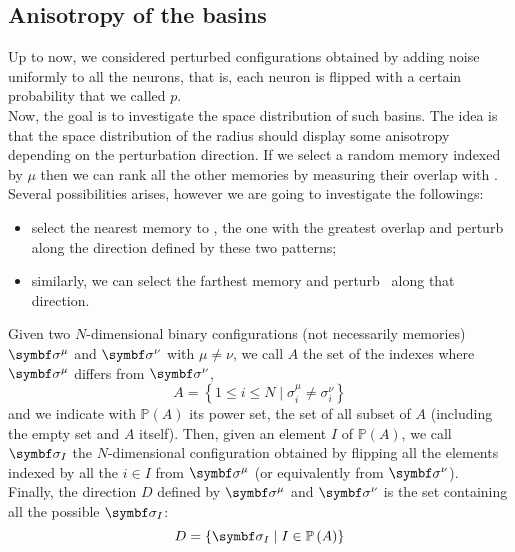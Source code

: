 \documentclass[\rootdir/main.tex]{subfiles}
\begin{document}
\clearpage
\subsection{Anisotropy of the basins}
Up to now, we considered perturbed configurations obtained by adding noise uniformly to all the neurons, that is, each neuron is flipped with a certain probability that we called $p$.\\
Now, the goal is to investigate the space distribution of such basins. The idea is that the space distribution of the radius should display some anisotropy depending on the perturbation direction. If we select a random memory indexed by $\mu$ then we can rank all the other memories by measuring their overlap with \bxi. Several possibilities arises, however we are going to investigate the followings:
\begin{itemize}
    \item select the nearest memory to \bxi, \ie the one with the greatest overlap and perturb along the direction defined by these two patterns;
    \item similarly, we can select the farthest memory and perturb \bxi\ along that direction.
\end{itemize}
\begin{definition}
\label{def:direction}
    Given two $N$-dimensional binary configurations (not necessarily memories) $\bsigma^{\mu}$ and $\bsigma^{\nu}$ with $\mu \neq \nu$, we call ${A}$ the set of the indexes where $\bsigma^{\mu}$ differs from $\bsigma^{\nu}$,
    \begin{equation*}
        {A} = \left\{ 1 \leq i \leq N \mid \sigma_i^\mu \neq \sigma_i^\nu  \right\}
    \end{equation*}
    and we indicate with $\mathbb{P}\left({A}\right)$ its power set, \ie the set of all subset of ${A}$ (including the empty set and ${A}$ itself).
    Then, given an element ${I}$ of $\mathbb{P}\left({A}\right)$, we call $\bsigma_{{I}}$ the $N$-dimensional configuration obtained by flipping all the elements indexed by all the $i \in {I}$ from $\bsigma^{\mu}$ (or equivalently from $\bsigma^{\nu}$).\\
    Finally, the direction ${D}$ defined by $\bsigma^{\mu}$ and $\bsigma^{\nu}$ is the set containing all the possible $\bsigma_{{I}}$:
    \begin{equation}
        {D} = \left\{\bsigma_{{I}} \mid {I} \in \mathbb{P}\left({A}\right)  \right\}
    \end{equation}
\end{definition}
\end{document}
